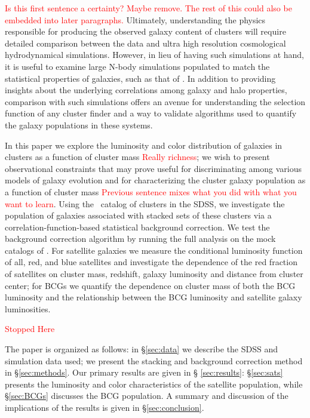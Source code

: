 \documentclass{emulateapj}
\begin{document}
\textcolor{red}{Is this first sentence a certainty? Maybe remove. The rest of
this could also be embedded into later paragraphs.} Ultimately, understanding
the physics responsible for producing the observed galaxy content of clusters
will require detailed comparison between the data and ultra high resolution
cosmological hydrodynamical simulations.  However, in lieu of having such
simulations at hand, it is useful to examine large N-body simulations populated
to match the statistical properties of galaxies, such as that of
\citet{Wechsler}. In addition to providing insights about the underlying
correlations among galaxy and halo properties, comparison with such simulations
offers an avenue for understanding the selection function of any cluster finder
and a way to validate algorithms used to quantify the galaxy populations in
these systems.

In this paper we explore the luminosity and color distribution of galaxies in
clusters as a function of cluster mass \textcolor{red}{Really richness}; we
wish to present observational constraints that may prove useful for
discriminating among various models of galaxy evolution and for characterizing
the cluster galaxy population as a function of cluster mass
\textcolor{red}{Previous sentence mixes what you did with what you want to learn}.
Using the \maxbcg\ catalog of clusters in the SDSS, we investigate the population
of galaxies associated with stacked sets of these clusters via a
correlation-function-based statistical background correction. We test the
background correction algorithm by running the full analysis on the mock
catalogs of \citet{Wechsler}. For satellite galaxies we measure the conditional
luminosity function of all, red, and blue satellites and investigate the
dependence of the red fraction of satellites on cluster mass, redshift, galaxy
luminosity and distance from cluster center; for BCGs we quantify the
dependence on cluster mass of both the BCG luminosity and the relationship
between the BCG luminosity and satellite galaxy luminosities.

\textcolor{red}{Stopped Here}

The paper is organized as follows: in \S \ref{sec:data} we describe the SDSS
and simulation data used; we present the stacking and background correction
method in \S \ref{sec:methods}. Our primary results are given in \S
\ref{sec:results}: \S \ref{sec:sats} presents the luminosity and color
characteristics of the satellite population, while \S \ref{sec:BCGs} discusses
the BCG population. A summary and discussion of the implications of the results
is given in \S \ref{sec:conclusion}.  
\end{document}
